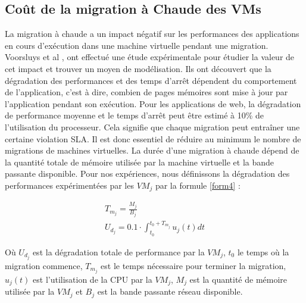 \subsection{Coût de la migration à Chaude des VMs}
\begin{onehalfspace}
La migration à chaude a un impact négatif sur les performances des applications en cours d'exécution dans une machine virtuelle pendant une migration. Voorsluys et al  \cite{ref38}, ont effectué une étude expérimentale pour étudier la valeur de cet impact et trouver un moyen de modélisation. Ils ont découvert que la dégradation des performances et des temps d'arrêt dépendent du comportement de l'application, c'est à dire, combien de pages mémoires sont mise à jour par l'application pendant son exécution. Pour les applications de web,  la dégradation de performance moyenne et  le temps d'arrêt peut être estimé à 10\% de l'utilisation du processeur. Cela signifie que chaque migration peut entraîner une certaine violation SLA. Il est donc essentiel de réduire au minimum le nombre de migrations de machines virtuelles. La durée d'une migration à chaude dépend de la quantité totale de mémoire utilisée par la machine virtuelle et la bande passante disponible. Pour nos expériences, nous définissons la dégradation des performances expérimentées par les $VM_j$ par la formule \ref{form4} \cite{ref43}: \bigskip

\begin{align}
 T_{m_{j}} = \frac{M_{j}}{B_{j}} \\
 U_{d_{j}} = 0.1\cdot \int_{t_{0}}^{t_{0}+T_{m_{j}}} {u_{j}(t) dt} \label{form4}
\end{align}
\bigskip

Où $U_{d_{j}}$ est la dégradation totale de performance par la $VM_j$, $t_{0}$ le temps où la migration commence, $T_{m_{j}}$ est le temps nécessaire pour terminer la migration, $u_{j}(t)$ est l'utilisation de la CPU par la $VM_j$, $M_{j}$ est la quantité de mémoire utilisée par la $VM_j$ et $B_{j}$ est la bande passante réseau disponible.
\end{onehalfspace}

